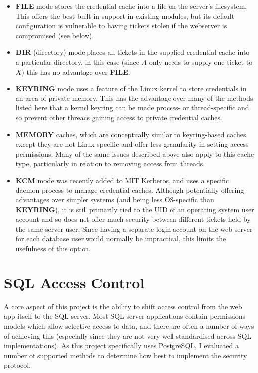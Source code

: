 \documentclass[12pt]{report}
\begin{document}
\begin{itemize}
\item
  \textbf{FILE} mode stores the credential cache into a file on the server's filesystem. This offers the best built-in support in existing modules, but its default configuration is vulnerable to having tickets stolen if the webserver is compromised (see below).
\item
  \textbf{DIR} (directory) mode places all tickets in the supplied credential cache into a particular directory. In this case (since $A$ only needs to supply one ticket to $X$) this has no advantage over \textbf{FILE}.
\item
  \textbf{KEYRING} mode uses a feature of the Linux kernel to store credentials in an area of private memory. This has the advantage over many of the methods listed here that a kernel keyring can be made process- or thread-specific and so prevent other threads gaining access to private credential caches.

\item
  \textbf{MEMORY} caches, which are conceptually similar to keyring-based caches except they are not Linux-specific and offer less granularity in setting access permissions. Many of the same issues described above also apply to this cache type, particularly in relation to removing access from threads.
\item
  \textbf{KCM} mode was recently added to MIT Kerberos, and uses a specific daemon process to manage credential caches. Although potentially offering advantages over simpler systems (and being less OS-specific than \textbf{KEYRING}), it is still primarily tied to the UID of an operating system user account and so does not offer much security between different tickets held by the same server user. Since having a separate login account on the web server for each database user would normally be impractical, this limits the usefulness of this option.
\end{itemize}

\section{SQL Access Control}
\label{sec:sql_access_control}
A core aspect of this project is the ability to shift access control from the web app itself to the SQL server. Most SQL server applications contain permissions models which allow selective access to data, and there are often a number of ways of achieving this (especially since they are not very well standardised across SQL implementations). As this project specifically uses PostgreSQL, I evaluated a number of supported methods to determine how best to implement the security protocol.
\end{document}
